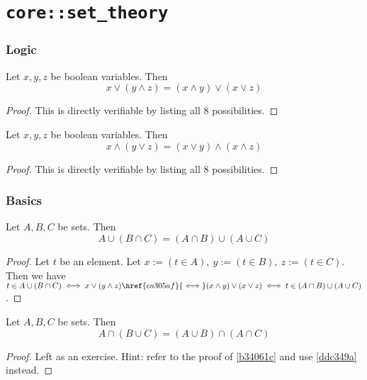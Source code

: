 \chapter{\texttt{core::set\_theory}}\label{f9174c1}

\begin{toc}
\end{toc}

\subsection{Logic}\label{e7d2b65}

\label{ea305af}

Let $x,y,z$ be boolean variables. Then
$$
  x\lor(y\land z)=(x\land y)\lor(x\lor z)
$$

\begin{proof}
  This is directly verifiable by listing all 8 possibilities.
\end{proof}

\label{ddc349a}

Let $x,y,z$ be boolean variables. Then
$$
  x\land(y\lor z)=(x\lor y)\land(x\land z)
$$

\begin{proof}
  This is directly verifiable by listing all 8 possibilities.
\end{proof}

\subsection{Basics}\label{a59f15a}

\label{b34061c}

Let $A,B,C$ be sets. Then
$$
  A\cup(B\cap C)=(A\cap B)\cup(A\cup C)
$$

\begin{proof}
  Let $t$ be an element. Let $x:=(t\in A),\ y:=(t\in B),\ z:=(t\in C)$. Then we
  have $t\in A\cup(B\cap C)\iff x\lor(y\land z)\href{ea305af}{\iff}(x\land
  y)\lor(x\lor z)\iff t\in(A\cap B)\cup(A\cup C)$.
\end{proof}

\label{ec55f1d}

Let $A,B,C$ be sets. Then
$$
  A\cap(B\cup C)=(A\cup B)\cap(A\cap C)
$$

\begin{proof}
  Left as an exercise. Hint: refer to the proof of \autoref{b34061c} and use
  \autoref{ddc349a} instead.
\end{proof}


